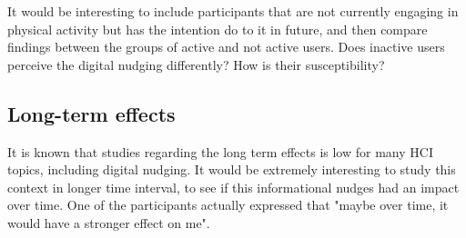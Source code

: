 
 It would be interesting to include participants that are not currently engaging in physical activity but has the intention do to it in future, and then compare findings between the groups of active and not active users. Does inactive users perceive the digital nudging differently? How is their susceptibility? 

\subsection{Long-term effects}
It is known that studies regarding the long term effects is low for many HCI topics, including digital nudging. It would be extremely interesting to study this context in longer time interval, to see if this informational nudges had an impact over time. One of the participants actually expressed that "maybe over time, it would have a stronger effect on me". 